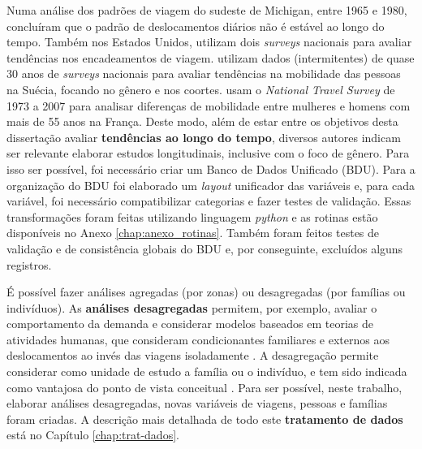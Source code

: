 Numa análise dos padrões de viagem do sudeste de Michigan, entre 1965 e 1980,   concluíram que o padrão de deslocamentos diários não é estável ao longo do tempo. Também nos Estados Unidos,  utilizam dois \textit{surveys} nacionais para avaliar tendências nos encadeamentos de viagem. 
 utilizam dados (intermitentes) de quase 30 anos de \textit{surveys} nacionais para avaliar tendências na mobilidade das pessoas na Suécia, focando no gênero e nos coortes.
 usam o \textit{National Travel Survey} de 1973 a 2007 para analisar diferenças de mobilidade entre mulheres e homens com mais de 55 anos na França.
Deste modo, além de estar entre os objetivos desta dissertação avaliar \textbf{tendências ao longo do tempo}, diversos autores indicam ser relevante elaborar estudos longitudinais, inclusive com o foco de gênero. Para isso ser possível, foi necessário criar um Banco de Dados Unificado (BDU).
Para a organização do BDU foi elaborado um \textit{layout} unificador das variáveis e, para cada variável, foi  necessário compatibilizar categorias e fazer testes de validação. Essas transformações foram feitas utilizando linguagem \textit{python} e as rotinas estão disponíveis no Anexo \ref{chap:anexo_rotinas}.
Também foram feitos testes de validação e de consistência globais do BDU e, por conseguinte, excluídos alguns registros. 

É possível fazer análises agregadas (por zonas) ou desagregadas (por famílias ou indivíduos).
As \textbf{análises desagregadas} permitem, por exemplo, avaliar o comportamento da demanda e considerar modelos baseados em teorias de atividades humanas, que consideram condicionantes familiares e externos aos deslocamentos ao invés das viagens isoladamente \cite{JONES1981}.
A desagregação permite considerar como unidade de estudo a família ou o indivíduo, e tem sido indicada como vantajosa do ponto de vista conceitual \cite{ORTUZAR1994}. 
Para ser possível, neste trabalho, elaborar análises desagregadas, novas variáveis de viagens, pessoas e famílias foram criadas.
A descrição mais detalhada de todo este \textbf{tratamento de dados} está no Capítulo \ref{chap:trat-dados}. 

